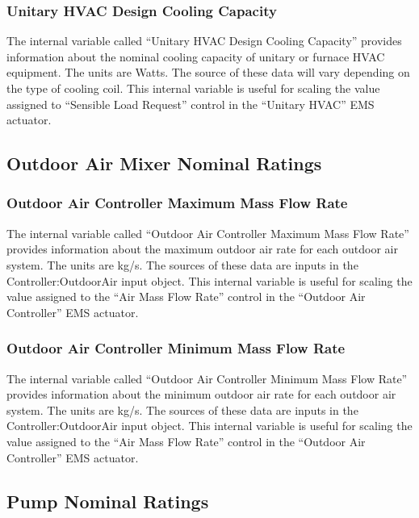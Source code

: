 \subsubsection{Unitary HVAC Design Cooling Capacity}\label{unitary-hvac-design-cooling-capacity}

The internal variable called ``Unitary HVAC Design Cooling Capacity'' provides information about the nominal cooling capacity of unitary or furnace HVAC equipment. The units are Watts. The source of these data will vary depending on the type of cooling coil. This internal variable is useful for scaling the value assigned to ``Sensible Load Request'' control in the ``Unitary HVAC'' EMS actuator.

\subsection{Outdoor Air Mixer Nominal Ratings}\label{outdoor-air-mixer-nominal-ratings}

\subsubsection{Outdoor Air Controller Maximum Mass Flow Rate}\label{outdoor-air-controller-maximum-mass-flow-rate}

The internal variable called ``Outdoor Air Controller Maximum Mass Flow Rate'' provides information about the maximum outdoor air rate for each outdoor air system. The units are kg/s. The sources of these data are inputs in the Controller:OutdoorAir input object. This internal variable is useful for scaling the value assigned to the ``Air Mass Flow Rate'' control in the ``Outdoor Air Controller'' EMS actuator.

\subsubsection{Outdoor Air Controller Minimum Mass Flow Rate}\label{outdoor-air-controller-minimum-mass-flow-rate}

The internal variable called ``Outdoor Air Controller Minimum Mass Flow Rate'' provides information about the minimum outdoor air rate for each outdoor air system. The units are kg/s. The sources of these data are inputs in the Controller:OutdoorAir input object. This internal variable is useful for scaling the value assigned to the ``Air Mass Flow Rate'' control in the ``Outdoor Air Controller'' EMS actuator.

\subsection{Pump Nominal Ratings}\label{pump-nominal-ratings}

